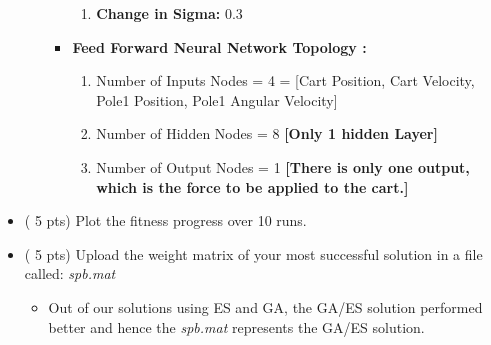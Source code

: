 \documentclass{article}
\begin{document}
\begin{itemize}
\begin{enumerate}
\begin{itemize}
\begin{enumerate}
	\item \textbf{Change in Sigma:} 0.3
	\end{enumerate}
	\item \textbf{Feed Forward Neural Network Topology :}
	\begin{enumerate}
	\item Number of Inputs Nodes = 4 = [Cart Position, Cart Velocity, Pole1 Position, Pole1 Angular Velocity]
	\item Number of Hidden Nodes = 8 \textbf{[Only 1 hidden Layer]}
	\item Number of Output Nodes = 1 \textbf{[There is only one output, which is the force to be applied to the cart.]}
	\end{enumerate}
	\end{itemize}
\end{enumerate}
\color{black}
	\item ( 5 pts) Plot the fitness progress over 10 runs.
	\item ( 5 pts) Upload the weight matrix of your most successful solution in a file called: \textit{spb.mat}
	\begin{itemize}
	\color{blue}
	\item Out of our solutions using ES and GA, the GA/ES solution performed better and hence the \textit{spb.mat} represents the GA/ES solution.
	\color{black} 
	\end{itemize}
\end{itemize}

\newpage
\end{document}
